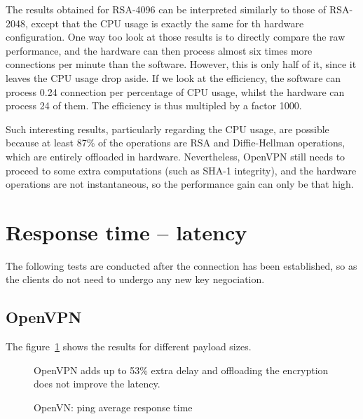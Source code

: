 \noindent The results obtained for RSA-4096 can be interpreted similarly to those of RSA-2048, except that the CPU usage is exactly the same for th hardware configuration.
One way too look at those results is to directly compare the raw performance, and the hardware can then process almost six times more connections per minute than the software.
However, this is only half of it, since it leaves the CPU usage drop aside.
If we look at the efficiency, the software can process 0.24 connection per percentage of CPU usage, whilst the hardware can process 24 of them.
The efficiency is thus multipled by a factor 1000.

Such interesting results, particularly regarding the CPU usage, are possible because at least 87\% of the operations are RSA and Diffie-Hellman operations, which are entirely offloaded in hardware.
Nevertheless, OpenVPN still needs to proceed to some extra computations (such as SHA-1 integrity), and the hardware operations are not instantaneous, so the performance gain can only be that high.












\section{Response time -- latency}
The following tests are conducted after the connection has been established, so as the clients do not need to undergo any new key negociation.

\subsection{OpenVPN}
The figure~\ref{fig:ping-benchmark-openvpn} shows the results for different payload sizes.

\begin{figure}[ht]

\caption{OpenVN: ping average response time}{OpenVPN adds up to 53\% extra delay and offloading the encryption does not improve the latency.}
\label{fig:ping-benchmark-openvpn}
\end{figure}

